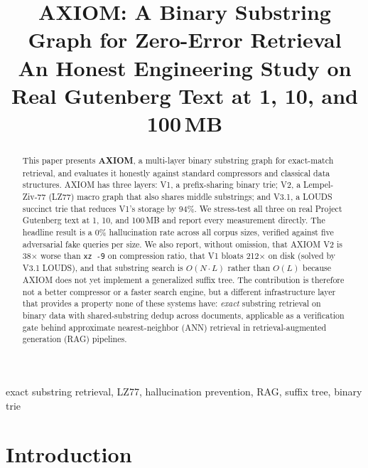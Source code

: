 \documentclass[conference]{IEEEtran}
\begin{document}
\title{AXIOM: A Binary Substring Graph for Zero-Error Retrieval\\
\large An Honest Engineering Study on Real Gutenberg Text at 1, 10, and 100\,MB}

\author{
}

\maketitle

\begin{abstract}
This paper presents \textbf{AXIOM}, a multi-layer binary substring graph for exact-match retrieval, and evaluates it honestly against standard compressors and classical data structures. AXIOM has three layers: V1, a prefix-sharing binary trie; V2, a Lempel-Ziv-77 (LZ77) macro graph that also shares middle substrings; and V3.1, a LOUDS succinct trie that reduces V1's storage by 94\%. We stress-test all three on real Project Gutenberg text at 1, 10, and 100\,MB and report every measurement directly. The headline result is a 0\% hallucination rate across all corpus sizes, verified against five adversarial fake queries per size. We also report, without omission, that AXIOM V2 is 38$\times$ worse than \texttt{xz -9} on compression ratio, that V1 bloats 212$\times$ on disk (solved by V3.1 LOUDS), and that substring search is $O(N{\cdot}L)$ rather than $O(L)$ because AXIOM does not yet implement a generalized suffix tree. The contribution is therefore not a better compressor or a faster search engine, but a different infrastructure layer that provides a property none of these systems have: \emph{exact} substring retrieval on binary data with shared-substring dedup across documents, applicable as a verification gate behind approximate nearest-neighbor (ANN) retrieval in retrieval-augmented generation (RAG) pipelines.
\end{abstract}

\begin{IEEEkeywords}
exact substring retrieval, LZ77, hallucination prevention, RAG, suffix tree, binary trie
\end{IEEEkeywords}

\section{Introduction}
\end{document}
